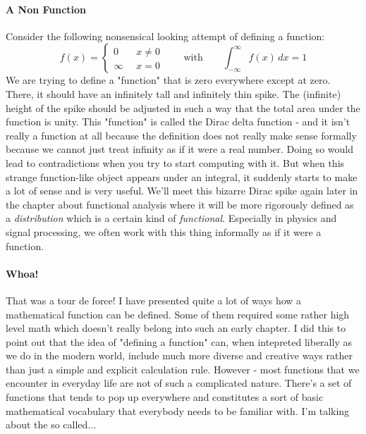 \paragraph{A Non Function}
Consider the following nonsensical looking attempt of defining a function:
\begin{equation}
f(x) = 
\begin{cases} 
0       \quad& x \neq 0 \\
\infty       & x = 0
\end{cases} \qquad \text{with} \qquad
\int_{-\infty}^{\infty} f(x) \, dx = 1
\end{equation}
We are trying to define a "function" that is zero everywhere except at zero. There, it should have an infinitely tall and infinitely thin spike. The (infinite) height of the spike should be adjusted in such a way that the total area under the function is unity. This "function" is called the Dirac delta function - and it isn't really a function at all because the definition does not really make sense formally because we cannot just treat infinity as if it were a real number. Doing so would lead to contradictions when you try to start computing with it. But when this strange function-like object appears under an integral, it suddenly starts to make a lot of sense and is very useful. We'll meet this bizarre Dirac spike again later in the chapter about functional analysis where it will be more rigorously defined as a \emph{distribution} which is a certain kind of \emph{functional}. Especially in physics and signal processing, we often work with this thing informally as if it were a function.




\paragraph{Whoa!} That was a tour de force! I have presented quite a lot of ways how a mathematical function can be defined. Some of them required some rather high level math which doesn't really belong into such an early chapter. I did this to point out that the idea of "defining a function" can, when intepreted liberally as we do in the modern world, include much more diverse and creative ways rather than just a simple and explicit calculation rule. However - most functions that we encounter in everyday life are not of such a complicated nature. There's a set of functions that tends to pop up everywhere and constitutes a sort of basic mathematical vocabulary that everybody needs to be familiar with. I'm talking about the so called...

